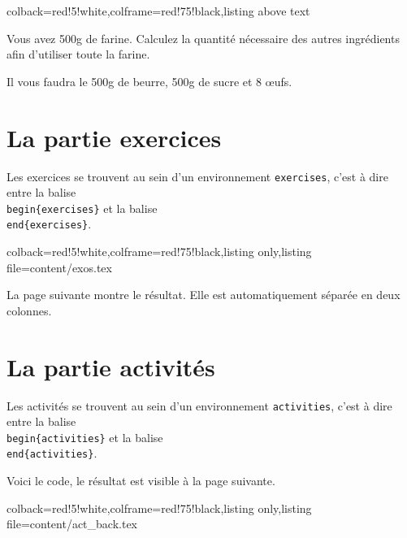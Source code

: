 \begin{lesson}
\begin{tcblisting}{colback=red!5!white,colframe=red!75!black,listing above text}
\begin{exo}[type=method]
Vous avez 500g de farine. Calculez la quantité nécessaire des autres ingrédients afin d'utiliser toute la farine.

\begin{sol}
Il vous faudra le 500g de beurre,  500g de sucre et 8 œufs.
\end{sol} 
\end{exo}

\end{tcblisting}


\pagebreak

\section{La partie exercices} \label{partie_exos}

Les exercices se trouvent au sein d'un environnement \texttt{exercises}, c'est à dire entre la balise  \texttt{\\begin\{exercises\}} et la balise  \texttt{\\end\{exercises\}}.

 \begin{tcbinputlisting}{colback=red!5!white,colframe=red!75!black,listing only,listing file={content/exos.tex}}
 \end{tcbinputlisting}


La page suivante montre le résultat. Elle est automatiquement séparée en deux colonnes.
\end{lesson}



\begin{exercises}

\end{exercises}

\newpage

\section{La partie activités} \label{partie_activite}


Les activités se trouvent au sein d'un environnement \texttt{activities}, c'est à dire entre la balise  \texttt{\\begin\{activities\}} et la balise  \texttt{\\end\{activities\}}.

Voici le code, le résultat est visible à la page suivante.


\begin{tcbinputlisting}{colback=red!5!white,colframe=red!75!black,listing only,listing file={content/act_back.tex}}\end{tcbinputlisting}





